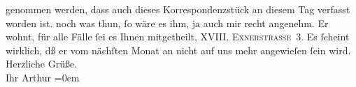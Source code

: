 \begin{ledgroupsized}[t]{13cm}
{{{                  genommen werden, dass auch dieses Korrespondenzstück an diesem Tag verfasst
                  worden ist.}}}\label{K_L00324-1h} noch was thun, ſo wäre es ihm, ja auch mir recht angenehm. Er wohnt,
               für alle Fälle ſei es Ihnen mitgetheilt, \textsc{XVIII. Exnerstraße 3}. Es ſcheint wirklich, dß er vom nächſten Monat {\pb}an
               nicht auf uns mehr angewieſen ſein wird.\pend
           \pstart
           Herzliche Grüße.{\\[\baselineskip]}Ihr \spacefill\mbox{Arthur}\pend
           \leftskip=0em{}
         
         \endnumbering{}\end{ledgroupsized}  \newcommand{\dateiname}{L00324}\newcommand{\titel}{Arthur Schnitzler an Hugo von Hofmannsthal, [15. 5. 1894?]}\newcommand{\editorInnen}{Martin Anton Müller und Gerd-Hermann Susen}
      